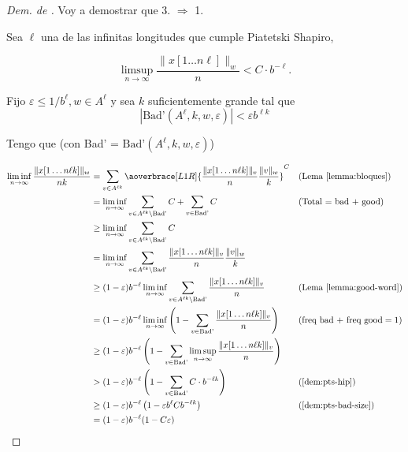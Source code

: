 \documentclass{article}
\theoremstyle{definition} %
\begin{document}
\begin{proof}[Dem. de ]
    Voy a demostrar que 3. $\Rightarrow$ 1.

    Sea $\ell$ una de las infinitas longitudes que cumple Piatetski
    Shapiro,
    
    \begin{equation}\label{dem:pts-hip}
        \limsup_{n \to \infty}
        \frac{\|x[1\dots n\ell]\|_w}{n} < C \cdot b^{-\ell}.
    \end{equation}

    Fijo $\varepsilon \leq 1/b^\ell, w \in A^\ell$ y sea $k$ suficientemente
    grande tal que 
    \begin{equation}\label{dem:pts-bad-size}
        |\text{Bad'}(A^\ell, k, w, \varepsilon)| < \varepsilon b^{\ell k}
    \end{equation}

    Tengo que (con Bad' = $\text{Bad'}(A^\ell, k, w, \varepsilon)$)

    \begin{align*}
        \liminf_{n\to \infty} \frac{\|x[1\dots n\ell k]\|_w}{nk}
        &= \sum_{v\in A^{\ell k}}
            \aoverbrace[L1R]{
                \frac{\|x[1\dots n\ell k]\|_v}{n}
                \frac{\|v\|_w}{k}
            }^{C}
        &&\text{(Lema \ref{lemma:bloques})} \\
        &= \liminf_{n\to \infty}
            \sum_{v\in A^{\ell k} \setminus \text{Bad'}} C +
            \sum_{v\in\text{Bad'}} C
        &&(\text{Total = bad + good}) \\
        &\geq \liminf_{n\to \infty}
            \sum_{v\in A^{\ell k} \setminus \text{Bad'}} C \\
        &= \liminf_{n\to \infty}
            \sum_{v\in A^{\ell k} \setminus \text{Bad'}}
                \frac{\|x[1\dots n\ell k]\|_v}{n}
                \frac{\|v\|_w}{k} \\
        &\geq (1-\varepsilon)b^{-\ell} \liminf_{n\to \infty}
            \sum_{v\in A^{\ell k} \setminus \text{Bad'}}
                \frac{\|x[1\dots n\ell k]\|_v}{n}
        &&\text{(Lema \ref{lemma:good-word})} \\
        &=(1-\varepsilon)b^{-\ell} \liminf_{n\to \infty}
            \left(1 - 
                \sum_{v\in \text{Bad'}}
                    \frac{\|x[1\dots n\ell k]\|_v}{n}
            \right)
        &&(\text{freq bad + freq good} = 1) \\
        &\geq(1-\varepsilon)b^{-\ell}
            \left(1 - 
                \sum_{v\in \text{Bad'}}
                    \limsup_{n\to \infty}
                    \frac{\|x[1\dots n\ell k]\|_v}{n}
            \right)\\
        &> (1-\varepsilon)b^{-\ell}
        \left(1 - 
            \sum_{v\in \text{Bad'}}
                C \cdot b^{-\ell k}
        \right)
        &&(\text{\ref{dem:pts-hip}}) \\
        &\geq (1-\varepsilon)b^{-\ell}
        \left(1 - 
            \varepsilon b^{\ell} C b^{-\ell k}
        \right)
        &&(\text{\ref{dem:pts-bad-size}}) \\
        &= (1-\varepsilon)b^{-\ell} (1 - C \varepsilon)
    \end{align*}


\end{proof}
\end{document}
